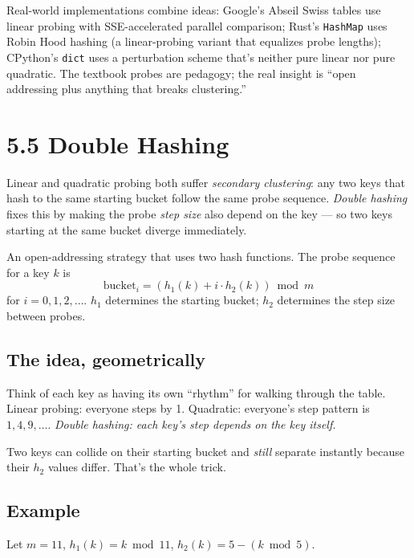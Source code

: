 \documentclass[11pt]{article}
\begin{document}
\begin{notebox}
Real-world implementations combine ideas: Google's Abseil Swiss
tables use linear probing with SSE-accelerated parallel
comparison; Rust's \texttt{HashMap} uses Robin Hood hashing (a
linear-probing variant that equalizes probe lengths); CPython's
\texttt{dict} uses a perturbation scheme that's neither pure
linear nor pure quadratic. The textbook probes are pedagogy; the
real insight is ``open addressing plus anything that breaks
clustering.''
\end{notebox}

\section{5.5 Double Hashing}

Linear and quadratic probing both suffer \emph{secondary
clustering}: any two keys that hash to the same starting bucket
follow the same probe sequence. \emph{Double hashing} fixes this
by making the probe \emph{step size} also depend on the key ---
so two keys starting at the same bucket diverge immediately.

\begin{defnbox}
An open-addressing strategy that uses two hash functions. The
probe sequence for a key $k$ is
$$\text{bucket}_i = (h_1(k) + i \cdot h_2(k)) \bmod m$$
for $i = 0, 1, 2, \ldots$. $h_1$ determines the starting bucket;
$h_2$ determines the step size between probes.
\end{defnbox}

\subsection*{The idea, geometrically}

Think of each key as having its own ``rhythm'' for walking
through the table. Linear probing: everyone steps by 1.
Quadratic: everyone's step pattern is $1, 4, 9, \ldots$.
\emph{Double hashing: each key's step depends on the key itself.}

Two keys can collide on their starting bucket and \emph{still}
separate instantly because their $h_2$ values differ. That's the
whole trick.

\subsection*{Example}

Let $m = 11$, $h_1(k) = k \bmod 11$, $h_2(k) = 5 - (k \bmod 5)$.
\end{document}
